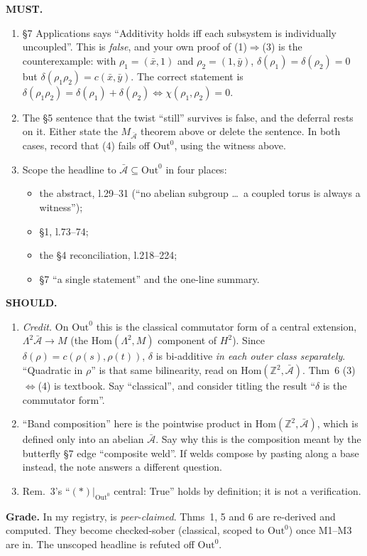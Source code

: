 \documentclass[10pt]{article}
\newcommand{\Z}{\mathbb{Z}}
\newcommand{\Out}{\mathrm{Out}}
\newcommand{\tf}[1]{\texttt{\detokenize{#1}}}
\begin{document}
\textbf{MUST.}
\begin{enumerate}[label=\textbf{M\arabic*}]
\item \S7 Applications says ``Additivity holds iff each subsystem is individually uncoupled''. This is \emph{false}, and your own proof of (1)$\Rightarrow$(3) is the counterexample: with $\rho_1=(\bar x,1)$ and $\rho_2=(1,\bar y)$, $\delta(\rho_1)=\delta(\rho_2)=0$ but $\delta(\rho_1\rho_2)=c(\bar x,\bar y)$. The correct statement is $\delta(\rho_1\rho_2)=\delta(\rho_1)+\delta(\rho_2)\iff\chi(\rho_1,\rho_2)=0$.
\item The \S5 sentence that the twist ``still'' survives is false, and the deferral rests on it. Either state the $M_{\bar{\mathcal A}}$ theorem above or delete the sentence. In both cases, record that (4) fails off $\Out^0$, using the witness above.
\item Scope the headline to $\bar{\mathcal A}\subseteq\Out^0$ in four places:
  \begin{itemize}
  \item the abstract, l.29--31 (``no abelian subgroup \dots\ a coupled torus is always a witness'');
  \item \S1, l.73--74;
  \item the \S4 reconciliation, l.218--224;
  \item \S7 ``a single statement'' and the one-line summary.
  \end{itemize}
\end{enumerate}
\textbf{SHOULD.}
\begin{enumerate}[label=\textbf{S\arabic*}]
\item \emph{Credit.} On $\Out^0$ this is the classical commutator form of a central extension, $\Lambda^2\bar{\mathcal A}\to M$ (the $\mathrm{Hom}(\Lambda^2,M)$ component of $H^2$). Since $\delta(\rho)=c(\rho(s),\rho(t))$, $\delta$ is bi-additive \emph{in each outer class separately}. ``Quadratic in $\rho$'' is that same bilinearity, read on $\mathrm{Hom}(\Z^2,\bar{\mathcal A})$. Thm~6 (3)$\Leftrightarrow$(4) is textbook. Say ``classical'', and consider titling the result ``$\delta$ is the commutator form''.
\item ``Band composition'' here is the pointwise product in $\mathrm{Hom}(\Z^2,\bar{\mathcal A})$, which is defined only into an abelian $\bar{\mathcal A}$. Say why this is the composition meant by the butterfly \S7 edge ``composite weld''. If welds compose by pasting along a base instead, the note answers a different question.
\item Rem.~3's ``$(\ast)|_{\Out^0}$ central: True'' holds by definition; it is not a verification.
\end{enumerate}
\textbf{Grade.} In my registry, \tf{macbeth-delta-quadratic-in-band-0edf2e6} is \emph{peer-claimed}. Thms~1, 5 and 6 are re-derived and computed. They become checked-sober (classical, scoped to $\Out^0$) once M1--M3 are in. The unscoped headline is refuted off $\Out^0$.
\end{document}
